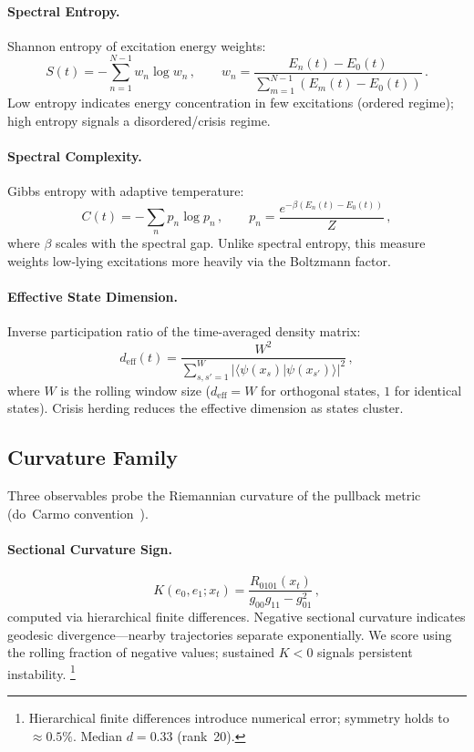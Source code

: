 \documentclass[3p]{elsarticle}
\newcommand{\braket}[2]{\langle#1|#2\rangle}
\begin{document}
\paragraph{Spectral Entropy.}
Shannon entropy of excitation energy weights:
\begin{equation}\label{eq:spectral_entropy}
  S(t) = -\sum_{n=1}^{N-1} w_n \log w_n\,,\qquad
  w_n = \frac{E_n(t) - E_0(t)}{\sum_{m=1}^{N-1}(E_m(t) - E_0(t))}\,.
\end{equation}
Low entropy indicates energy concentration in few excitations
(ordered regime); high entropy signals a disordered/crisis regime.

\paragraph{Spectral Complexity.}
Gibbs entropy with adaptive temperature:
\begin{equation}\label{eq:spectral_complexity}
  C(t) = -\sum_n p_n \log p_n\,,\qquad
  p_n = \frac{e^{-\beta(E_n(t) - E_0(t))}}{Z}\,,
\end{equation}
where $\beta$ scales with the spectral gap.  Unlike spectral entropy,
this measure weights low-lying excitations more heavily via the
Boltzmann factor.

\paragraph{Effective State Dimension.}
Inverse participation ratio of the time-averaged density matrix:
\begin{equation}\label{eq:eff_state_dim}
  d_{\text{eff}}(t) = \frac{W^2}{\sum_{s,s'=1}^{W}
    |\braket{\psi(x_s)}{\psi(x_{s'})}|^2}\,,
\end{equation}
where $W$ is the rolling window size ($d_{\text{eff}} = W$ for
orthogonal states, $1$ for identical states).  Crisis herding reduces
the effective dimension as states cluster.

\subsection{Curvature Family}%
\label{subsec:sect_curv}\label{subsec:geodesic_curv}\label{subsec:curv_rate}

Three observables probe the Riemannian curvature of the pullback
metric (do~Carmo convention~\cite{docarmo1992}).

\paragraph{Sectional Curvature Sign.}
\begin{equation}\label{eq:sect_curv}
  K(e_0, e_1; x_t) = \frac{R_{0101}(x_t)}{g_{00}g_{11} - g_{01}^2}\,,
\end{equation}
computed via hierarchical finite differences.  Negative sectional
curvature indicates geodesic divergence---nearby trajectories
separate exponentially.  We score using the rolling fraction of
negative values; sustained $K < 0$ signals persistent instability.%
\footnote{Hierarchical finite differences introduce numerical error;
  symmetry holds to ${\approx}0.5\%$.  Median $d = 0.33$ (rank~20).}
\end{document}
